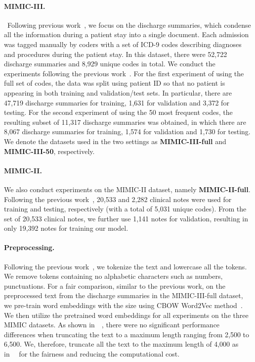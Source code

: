 \documentclass{article}
\begin{document}
\paragraph{MIMIC-III.}\ Following previous work~\cite{mullenbach2018,xie2019ehr,li2020multirescnn}, we focus on the discharge summaries, which condense all the information during a patient stay into a single document. Each admission was tagged manually by coders with a set of ICD-9 codes describing diagnoses and procedures during the patient stay. In this dataset, there were 52,722 discharge summaries and 8,929 unique codes in total. We conduct the experiments following the previous work~\cite{mullenbach2018}. For the first experiment of using the full set of codes, the data was split using patient ID so that no patient is appearing in both training and validation/test sets. In particular, there are 47,719 discharge summaries for training, 1,631 for validation and 3,372 for testing. For the second experiment of using the 50 most frequent codes, the resulting subset of 11,317 discharge summaries was obtained, in which there are 8,067 discharge summaries for training, 1,574 for validation and 1,730 for testing. We denote the datasets used in the two settings as \textbf{MIMIC-III-full} and \textbf{MIMIC-III-50}, respectively.

\paragraph{MIMIC-II.} We also conduct experiments on the MIMIC-II dataset, namely \textbf{MIMIC-II-full}. Following the previous work~\cite{perotte2013diagnosis,mullenbach2018,li2020multirescnn}, 20,533 and 2,282 clinical notes were used for training and testing, respectively (with a total of 5,031 unique codes). From the set of 20,533 clinical notes, we further use 1,141 notes for validation, resulting in only 19,392 notes for training our model.

\paragraph{Preprocessing.} Following the previous work~\cite{mullenbach2018,xie2019ehr,li2020multirescnn}, we tokenize the text and lowercase all the tokens. We remove tokens containing no alphabetic characters such as numbers, punctuations. For a fair comparison, similar to the previous work, on the preprocessed text from the discharge summaries in the MIMIC-III-full dataset, we pre-train word embeddings with the size  using CBOW Word2Vec method~\cite{mikolov2013}. We then utilize the pretrained word embeddings for all experiments on the three MIMIC datasets.
As shown in~\citeauthor{li2020multirescnn}~, there were no significant performance differences when truncating the text to a maximum length ranging from 2,500 to 6,500. We, therefore, truncate all the text to the maximum length of 4,000 as in~\citeauthor{xie2019ehr}~ for the fairness and reducing the computational cost.
\end{document}
